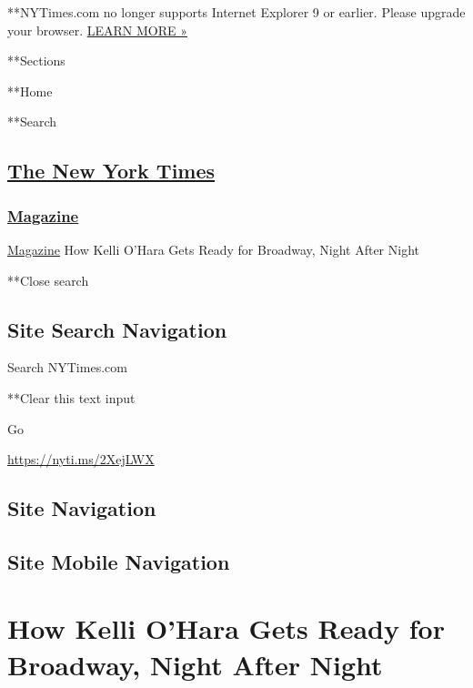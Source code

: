  **NYTimes.com no longer supports Internet Explorer 9 or earlier. Please
upgrade your browser.
\href{http://www.nytimes3xbfgragh.onion/content/help/site/ie9-support.html}{LEARN
MORE »}

**Sections

**Home

**Search

\hypertarget{the-new-york-times}{%
\subsection{\texorpdfstring{\href{http://www.nytimes3xbfgragh.onion/}{The
New York Times}}{The New York Times}}\label{the-new-york-times}}

\hypertarget{-magazine-}{%
\subsubsection{\texorpdfstring{
\href{https://www.nytimes3xbfgragh.onion/section/magazine}{Magazine}
}{ Magazine }}\label{-magazine-}}

 \href{https://www.nytimes3xbfgragh.onion/section/magazine}{Magazine}
\textbar{}How Kelli O'Hara Gets Ready for Broadway, Night After Night

**Close search

\hypertarget{site-search-navigation}{%
\subsection{Site Search Navigation}\label{site-search-navigation}}

Search NYTimes.com

**Clear this text input

Go

\url{https://nyti.ms/2XejLWX}

\hypertarget{site-navigation}{%
\subsection{Site Navigation}\label{site-navigation}}

\hypertarget{site-mobile-navigation}{%
\subsection{Site Mobile Navigation}\label{site-mobile-navigation}}

\hypertarget{how-kelli-ohara-gets-ready-for-broadway-night-after-night}{%
\section{How Kelli O'Hara Gets Ready for Broadway, Night After
Night}\label{how-kelli-ohara-gets-ready-for-broadway-night-after-night}}

